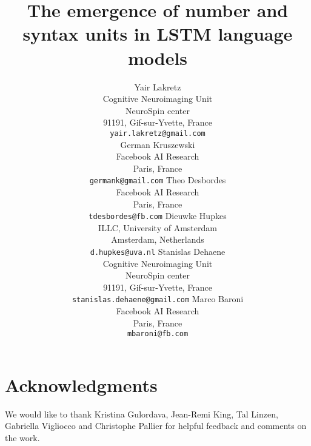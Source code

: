 \documentclass[11pt,a4paper]{article}
\title{The emergence of number and syntax units in LSTM language models}
\author{Yair Lakretz\\Cognitive Neuroimaging Unit\\NeuroSpin center\\91191, Gif-sur-Yvette, France\\{\tt yair.lakretz@gmail.com}\\
\And
	German Kruszewski\\Facebook AI Research\\Paris, France\\ {\tt germank@gmail.com}
	\AND
	Theo Desbordes\\Facebook AI Research\\Paris, France\\{\tt tdesbordes@fb.com}
  \And
	Dieuwke Hupkes\\ILLC, University of Amsterdam\\Amsterdam, Netherlands\\ {\tt d.hupkes@uva.nl}
  \AND
	Stanislas Dehaene\\Cognitive Neuroimaging Unit\\NeuroSpin center\\91191, Gif-sur-Yvette, France\\{\tt stanislas.dehaene@gmail.com}
  \And
	Marco Baroni\\Facebook AI Research\\Paris, France\\{\tt mbaroni@fb.com}}
\date{}
\begin{document}
\maketitle










%
% 


\section*{Acknowledgments}
We would like to thank Kristina Gulordava, Jean-Remi King, Tal Linzen, Gabriella Vigliocco and Christophe Pallier for helpful feedback and comments on the work. 



\end{document}
